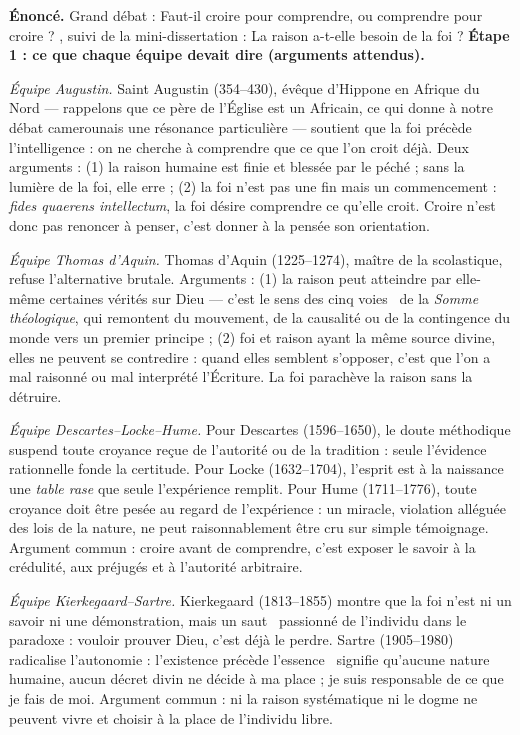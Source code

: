 \documentclass[11pt]{article}
\newcounter{popsec}
\newcounter{popsub}
\newcommand{\courssub}[1]{%
  \stepcounter{popsub}%
  \par\vspace{9pt}\noindent{\popxbold\fontsize{11.5}{13}\selectfont\color{popink}{\color{poporange}\thepopsec.\thepopsub}\hspace{6pt}#1}\par\nopagebreak\vspace{4pt}
}
\begin{document}
\courssub{Démarche et corrigé commenté}

\begin{exoresolu}
\textbf{Énoncé.} Grand débat : \guillemotleft Faut-il croire pour comprendre, ou comprendre pour croire ? \guillemotright, suivi de la mini-dissertation : \guillemotleft La raison a-t-elle besoin de la foi ? \guillemotright
\tcblower
\textbf{Étape 1 : ce que chaque équipe devait dire (arguments attendus).}

\emph{Équipe Augustin.} Saint Augustin (354--430), évêque d'Hippone en Afrique du Nord — rappelons que ce père de l'Église est un Africain, ce qui donne à notre débat camerounais une résonance particulière — soutient que la foi précède l'intelligence : on ne cherche à comprendre que ce que l'on croit déjà. Deux arguments : (1) la raison humaine est finie et blessée par le péché ; sans la lumière de la foi, elle erre ; (2) la foi n'est pas une fin mais un commencement : \emph{fides quaerens intellectum}, la foi désire comprendre ce qu'elle croit. Croire n'est donc pas renoncer à penser, c'est donner à la pensée son orientation.

\emph{Équipe Thomas d'Aquin.} Thomas d'Aquin (1225--1274), maître de la scolastique, refuse l'alternative brutale. Arguments : (1) la raison peut atteindre par elle-même certaines vérités sur Dieu — c'est le sens des \guillemotleft cinq voies \guillemotright\ de la \emph{Somme théologique}, qui remontent du mouvement, de la causalité ou de la contingence du monde vers un premier principe ; (2) foi et raison ayant la même source divine, elles ne peuvent se contredire : quand elles semblent s'opposer, c'est que l'on a mal raisonné ou mal interprété l'Écriture. La foi parachève la raison sans la détruire.

\emph{Équipe Descartes--Locke--Hume.} Pour Descartes (1596--1650), le doute méthodique suspend toute croyance reçue de l'autorité ou de la tradition : seule l'évidence rationnelle fonde la certitude. Pour Locke (1632--1704), l'esprit est à la naissance une \emph{table rase} que seule l'expérience remplit. Pour Hume (1711--1776), toute croyance doit être pesée au regard de l'expérience : un miracle, violation alléguée des lois de la nature, ne peut raisonnablement être cru sur simple témoignage. Argument commun : croire avant de comprendre, c'est exposer le savoir à la crédulité, aux préjugés et à l'autorité arbitraire.

\emph{Équipe Kierkegaard--Sartre.} Kierkegaard (1813--1855) montre que la foi n'est ni un savoir ni une démonstration, mais un \guillemotleft saut \guillemotright\ passionné de l'individu dans le paradoxe : vouloir prouver Dieu, c'est déjà le perdre. Sartre (1905--1980) radicalise l'autonomie : \guillemotleft l'existence précède l'essence \guillemotright\ signifie qu'aucune nature humaine, aucun décret divin ne décide à ma place ; je suis responsable de ce que je fais de moi. Argument commun : ni la raison systématique ni le dogme ne peuvent vivre et choisir à la place de l'individu libre.


\end{exoresolu}
\end{document}
